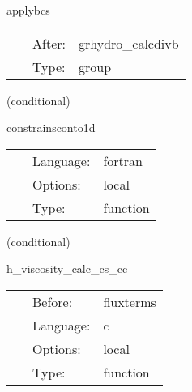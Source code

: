 \hspace{5mm} applybcs 

\hspace{5mm}{\it apply boundary conditions to divb } 


\hspace{5mm}

 \begin{tabular*}{160mm}{cll} 
~ & After:  & grhydro\_calcdivb \\ 
~ & Type:  & group \\ 
\end{tabular*} 


\vspace{5mm}

   (conditional) 

\hspace{5mm} constrainsconto1d 

\hspace{5mm}{\it constrain conserved fluid velocity to radial direction } 


\hspace{5mm}

 \begin{tabular*}{160mm}{cll} 
~ & Language:  & fortran \\ 
~ & Options:  & local \\ 
~ & Type:  & function \\ 
\end{tabular*} 


\vspace{5mm}

   (conditional) 

\hspace{5mm} h\_viscosity\_calc\_cs\_cc 

\hspace{5mm}{\it compute local temporaries for h viscosity - c++ version } 


\hspace{5mm}

 \begin{tabular*}{160mm}{cll} 
~ & Before:  & fluxterms \\ 
~ & Language:  & c \\ 
~ & Options:  & local \\ 
~ & Type:  & function \\ 
\end{tabular*} 


\vspace{5mm}

